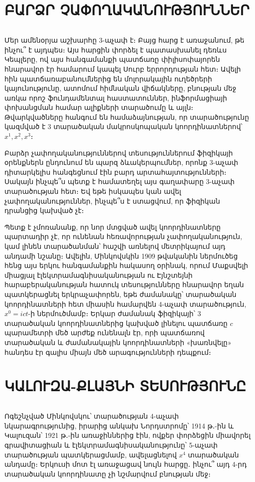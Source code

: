 \documentclass[12pt,a4paper]{article}
\begin{document}
\section{ԲԱՐՁՐ ՉԱՓՈՂԱԿԱՆՈՒԹՅՈՒՆՆԵՐ}

$\;$

Մեր ամենօրյա աշխարհը 3-աչափ է։ Բայց հարց է առաջանում, թե ինչու՞ է
այդպես։ Այս հարցին փորձել է պատասխանել դեռևս Կեպլերը, ով այս հանգամանքի
պատճառը փիլիսոփայորեն հնարավոր էր համարում կապել Սուրբ երրորդության
հետ։ Ավելի հին պատճառաբանումներից են մոլորակային ուղեծրերի կայունությունը,
ատոմում հիմնական վիճակները, բնության մեջ առկա որոշ ֆունդամենտալ հաստատուններ,
ինֆորմացիայի փոխանցման համար ալիքների տարածումը և այլն։ Թվարկվածները
հանգում են համաձայնության, որ տարածությունը կազմված է 3 տարածական
մակրոսկոպական կոորդինատներով՝ $x^{1},x^{2},x^{3}$։

Բարձր չափողականություններով տեսություններում ֆիզիկայի օրենքներն ընդունում
են պարզ ձևակերպումներ, որոնք 3-աչափ դիտարկելիս հանգեցնում էին բարդ
արտահայտությունների։ Սակայն ինչպե՞ս պետք է համատեղել այս գաղափարը
3-աչափ տարածության հետ։ Եվ եթե իսկապես կան ավել չափողականություններ,
ինչպե՞ս է ստացվում, որ ֆիզիկան դրանցից կախված չէ։

Պետք է չմոռանանք, որ նոր մտցված ավել կոորդինատները պարտադիր չէ, որ
ունենան հեռավորության չափողականություն, կամ լինեն տարածանման՝ հաշվի
առնելով մետրիկայում այդ անդամի նշանը։ Ավելին, Մինկովսկին 1909 թվականին
ներմուծեց հենց այս երկու հանգամանքին հակասող օրինակ, որում Մաքսվելի
միացյալ էլեկտրամագնիսականության ու Էյնշտեյնի հարաբերականության հատուկ
տեսությունները հնարավոր եղան պատկերացնել երկրաչափորեն, եթե ժամանակը՝
տարածական կոորդինատների հետ միասին համարվեն 4-աչափ տարածություն, $x^{0}=ict$-ի
ներմուծմամբ։ Երկար ժամանակ ֆիզիկայի՝ 3 տարածական կոորդինատներից կախված
լինելու պատճառը $c$ պարամետրի մեծ արժեք ունենալն էր, որի պատճառով
տարածական և ժամանակային կոորդինատների «խառնվելը» հանդես էր գալիս միայն
մեծ արագությունների դեպքում։

\section{ԿԱԼՈՒԶԱ-ՔԼԱՅՆԻ ՏԵՍՈՒԹՅՈՒՆԸ}

$\;$

Ոգեշնչված Մինկովսկու՝ տարածության 4-աչափ նկարագրությունից, իրարից
անկախ Նորդստրոմը՝ 1914 թ․-ին և Կալուզան՝ 1921 թ․-ին առաջիններից էին,
ովքեր փորձեցին միավորել գրավիտացիան և էլեկտրամագնիսականությունը՝ 5-աչափ
տարածության պատկերացմամբ, ավելացնելով $x^{4}$ տարածական անդամը։ Երկուսի
մոտ էլ առաջացավ նույն հարցը․ ինչու՞ այդ 4-րդ տարածական կոորդինատը
չի նշմարվում բնության մեջ։
\end{document}
